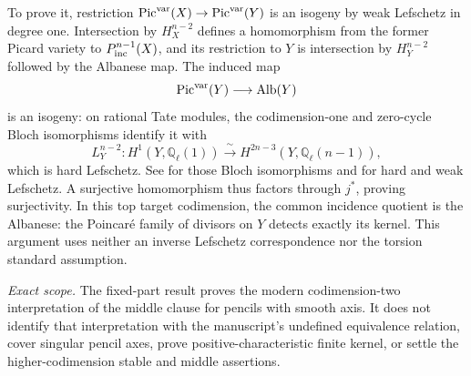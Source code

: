 To prove it, restriction
$\operatorname{Pic}^{\rm var}(X)\to\operatorname{Pic}^{\rm var}(Y)$
is an isogeny by weak Lefschetz in degree one. Intersection by
$H_X^{n-2}$ defines a homomorphism from the former Picard
variety to $P^{n-1}_{\rm inc}(X)$, and its restriction to $Y$
is intersection by $H_Y^{n-2}$ followed by the Albanese map.
The induced map
\[
 \operatorname{Pic}^{\rm var}(Y)\longrightarrow\operatorname{Alb}(Y)
\]
is an isogeny: on rational Tate modules, the codimension-one
and zero-cycle Bloch isomorphisms identify it with
\[
 L_Y^{n-2}:H^1(Y,\mathbb Q_\ell(1))
       \xrightarrow{\ \sim\ }H^{2n-3}(Y,\mathbb Q_\ell(n-1)),
\]
which is hard Lefschetz. See
\cite[Section 8.1, pp.~30--31]{DGJ_ACMVFunctor} for those
Bloch isomorphisms and
\cite[Theorem 4.1.1 and (4.1.6), pp.~217--219]{DGJ_Deligne1980}
for hard and weak Lefschetz. A surjective homomorphism thus
factors through $j^*$, proving surjectivity. In this top target
codimension, the common incidence quotient is the Albanese:
the Poincar\'e family of divisors on $Y$ detects exactly its
kernel. This argument uses neither an inverse Lefschetz
correspondence nor the torsion standard assumption.

\emph{Exact scope.}
The fixed-part result proves the modern codimension-two
interpretation of the middle clause for pencils with smooth
axis. It does not identify that interpretation with the
manuscript's undefined equivalence relation, cover singular
pencil axes, prove positive-characteristic finite kernel, or
settle the higher-codimension stable and middle assertions.
